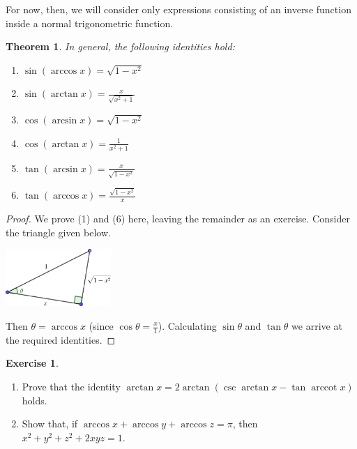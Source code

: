 \documentclass[a4paper,leqno]{article}
\numberwithin{equation}{section}
\newtheorem{thm}[equation]{Theorem}
\theoremstyle{definition}
\newtheorem{exercise}[equation]{Exercise}
\theoremstyle{remark}
\DeclareMathOperator{\arccot}{arccot}
\begin{document}
For now, then, we will consider only expressions consisting of an inverse function inside a normal trigonometric function.
\begin{thm}
  In general, the following identities hold:
  \begin{enumerate}
    \item $ \sin(\arccos x) = \sqrt{1 - x^2} $
    \item $ \sin(\arctan x) = \frac{x}{\sqrt{x^2 + 1}} $
    \item $ \cos(\arcsin x) = \sqrt{1 - x^2} $
    \item $ \cos(\arctan x) = \frac{1}{x^2 + 1} $
    \item $ \tan(\arcsin x) = \frac{x}{\sqrt{1 - x^2}} $
    \item $ \tan(\arccos x) = \frac{\sqrt{1 - x^2}}{x} $
  \end{enumerate}
\end{thm}
\begin{proof}
  We prove (1) and (6) here, leaving the remainder as an exercise. Consider the triangle given below.
  \begin{center}
    \includegraphics[width=0.3\textwidth]{invid1}
  \end{center}
  Then $ \theta = \arccos x $ (since $ \cos \theta = \frac{x}{1} $). Calculating $ \sin \theta $ and $ \tan \theta $
  we arrive at the required identities.
\end{proof}

\begin{exercise}\leavevmode
  \begin{enumerate}
    \item Prove that the identity $ \arctan x = 2\arctan(\csc \arctan x - \tan \arccot x) $ holds.
    \item Show that, if $ \arccos x + \arccos y + \arccos z = \pi $, then $ x^2 + y^2 + z^2 + 2xyz = 1 $.
  \end{enumerate}
\end{exercise}
\end{document}

